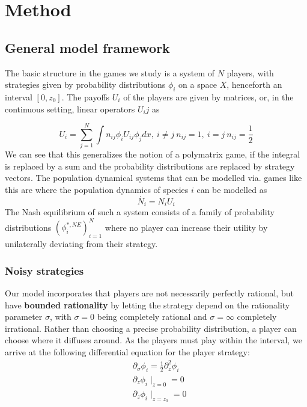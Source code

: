 \section{Method}
\subsection*{General model framework}


The basic structure in the games we study is a system of $N$ players, with strategies given by probability distributions $\phi_i$ on a space $X$, henceforth an interval $[0,z_0]$. The payoffs $U_i$ of the players are given by matrices, or, in the continuous setting, linear operators $U_ij$ as

\begin{equation}
  \label{eq:utility}
  U_i = \sum_{j=1}^N \int n_{ij}\phi_i U_{ij} \phi_j dx, ~i\neq j~n_{ij}=1,~i=j~n_{ij} = \frac{1}{2}
\end{equation}
We can see that this generalizes the notion of a polymatrix game, if the integral is replaced by a sum and the probability distributions are replaced by strategy vectors. The population dynamical systems that can be modelled via. games like this are where the population dynamics of species $i$ can be modelled as
\begin{equation}
  \dot{N_i} = N_i U_i
\end{equation}
The Nash equilibrium of such a system consists of a family of probability distributions $(\phi_i^{*,NE})_{i=1}^N$ where no player can increase their utility by unilaterally deviating from their strategy.

\subsubsection*{Noisy strategies}
Our model incorporates that players are not necessarily perfectly rational, but have \textbf{bounded rationality} by letting the strategy depend on the rationality parameter $\sigma$, with $\sigma=0$ being completely rational and $\sigma = \infty$ completely irrational. Rather than choosing a precise probability distribution, a player can choose where it diffuses around. As the players must play within the interval, we arrive at the following differential equation for the player strategy:
\begin{align}
  \label{eq:density_PDE}
	&\partial_\sigma \phi_i = \frac{1}{2}\partial_z^2 \phi_i \\
	&\partial_z \phi_i \mid_{z=0} = 0 \\
  &\partial_z \phi_i \mid_{z = z_0} = 0
\end{align}
  
